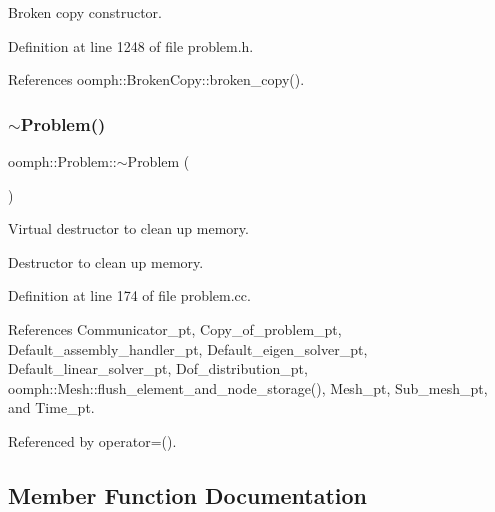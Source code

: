 Broken copy constructor. 



Definition at line 1248 of file problem.\+h.



References oomph\+::\+Broken\+Copy\+::broken\+\_\+copy().

\mbox{\label{classoomph_1_1Problem_ae2cd468ec03f7ede23c0dc8eea3be1cf}} 
\subsubsection{\texorpdfstring{$\sim$\+Problem()}{~Problem()}}
{\footnotesize\ttfamily oomph\+::\+Problem\+::$\sim$\+Problem (\begin{DoxyParamCaption}{ }\end{DoxyParamCaption})\hspace{0.3cm}{\ttfamily [virtual]}}



Virtual destructor to clean up memory. 

Destructor to clean up memory. 

Definition at line 174 of file problem.\+cc.



References Communicator\+\_\+pt, Copy\+\_\+of\+\_\+problem\+\_\+pt, Default\+\_\+assembly\+\_\+handler\+\_\+pt, Default\+\_\+eigen\+\_\+solver\+\_\+pt, Default\+\_\+linear\+\_\+solver\+\_\+pt, Dof\+\_\+distribution\+\_\+pt, oomph\+::\+Mesh\+::flush\+\_\+element\+\_\+and\+\_\+node\+\_\+storage(), Mesh\+\_\+pt, Sub\+\_\+mesh\+\_\+pt, and Time\+\_\+pt.



Referenced by operator=().



\subsection{Member Function Documentation}
\mbox{\label{classoomph_1_1Problem_ada40ec6730506c01109622c8383fe36e}} 
